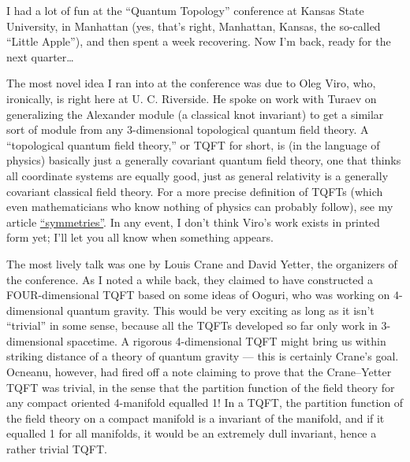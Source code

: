 \documentclass[12pt]{article}
\begin{document}
I had a lot of fun at the ``Quantum Topology'' conference at Kansas
State University, in Manhattan (yes, that's right, Manhattan, Kansas,
the so-called ``Little Apple''), and then spent a week recovering. Now
I'm back, ready for the next quarter\ldots{}

The most novel idea I ran into at the conference was due to Oleg Viro,
who, ironically, is right here at U. C. Riverside. He spoke on work with
Turaev on generalizing the Alexander module (a classical knot invariant)
to get a similar sort of module from any \(3\)-dimensional topological
quantum field theory. A ``topological quantum field theory,'' or TQFT
for short, is (in the language of physics) basically just a generally
covariant quantum field theory, one that thinks all coordinate systems
are equally good, just as general relativity is a generally covariant
classical field theory. For a more precise definition of TQFTs (which
even mathematicians who know nothing of physics can probably follow),
see my article
\href{http://math.ucr.edu/home/baez/symmetries.html}{``symmetries''}. In
any event, I don't think Viro's work exists in printed form yet; I'll
let you all know when something appears.

The most lively talk was one by Louis Crane and David Yetter, the
organizers of the conference. As I noted a while back, they claimed to
have constructed a FOUR-dimensional TQFT based on some ideas of Ooguri,
who was working on \(4\)-dimensional quantum gravity. This would be very
exciting as long as it isn't ``trivial'' in some sense, because all the
TQFTs developed so far only work in \(3\)-dimensional spacetime. A
rigorous 4-dimensional TQFT might bring us within striking distance of a
theory of quantum gravity --- this is certainly Crane's goal. Ocneanu,
however, had fired off a note claiming to prove that the Crane--Yetter
TQFT was trivial, in the sense that the partition function of the field
theory for any compact oriented 4-manifold equalled 1! In a TQFT, the
partition function of the field theory on a compact manifold is a
invariant of the manifold, and if it equalled 1 for all manifolds, it
would be an extremely dull invariant, hence a rather trivial TQFT.
\end{document}
